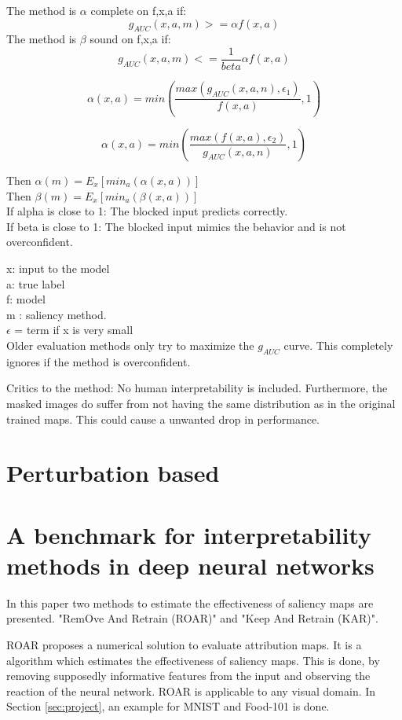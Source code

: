 The method is $\alpha$ complete on f,x,a if:
$$ g_{AUC} (x,a,m) >= \alpha f(x,a)$$
The method is $\beta$ sound on f,x,a if:
$$ g_{AUC} (x,a,m) <= \frac{1}{beta}\alpha f(x,a)$$

$$\alpha(x,a) = min(\frac{max(g_{AUC}(x,a,n),\epsilon_1)}{f(x,a)},1)$$

$$\alpha(x,a)=min(\frac{max(f(x,a),\epsilon_2)}{g_{AUC}(x,a,n)},1)$$

Then $\alpha(m) = E_x[min_a(\alpha(x,a))]$\\
Then $\beta(m) = E_x[min_a(\beta(x,a))]$\\

If alpha is close to 1: The blocked input predicts correctly. \\ If beta is close to 1: The blocked input mimics the behavior and is not overconfident.

x: input to the model \\
a: true label \\
f: model\\
m : saliency method.\\
$\epsilon$ = term if x is very small\\

Older evaluation methods only try to maximize the $g_{AUC}$ curve. This completely ignores if the method is overconfident.


Critics to the method: No human interpretability is included. Furthermore, the masked images do suffer from not having the same distribution as in the original trained maps. This could cause a unwanted drop in performance.

\section{Perturbation based \cite{7552539}}


\section{A benchmark for interpretability methods in deep neural networks \cite{hooker2019benchmark}}

In this paper two methods to estimate the effectiveness of saliency maps are presented. "RemOve And Retrain (ROAR)" and "Keep And Retrain (KAR)". 

ROAR proposes a numerical solution to evaluate attribution maps. It is a algorithm which estimates the effectiveness of saliency maps. This is done, by removing supposedly informative features from the input and observing the reaction of the neural network. ROAR is applicable to any visual domain. In Section \ref{sec:project}, an example for MNIST and Food-101 is done.


